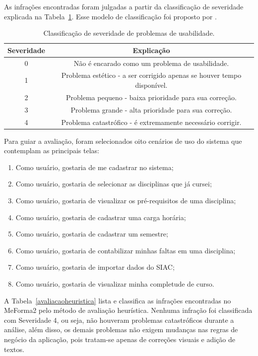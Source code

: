 As infrações encontradas foram julgadas a partir da classificação de severidade explicada na Tabela~\ref{severidade}. Esse modelo de classificação foi proposto por \cite{nielsen}.

\begin{table}[H]
\caption{Classificação de severidade de problemas de usabilidade.}
\label{severidade}
\begin{tabular}{ |c|c| } 
 \hline
 Severidade & Explicação \\
 \hline
 0 & Não é encarado como um problema de usabilidade. \\
 \hline
 1 & Problema estético - a ser corrigido apenas se houver tempo disponível. \\
 \hline
 2 &  Problema pequeno - baixa prioridade para sua correção. \\
 \hline
 3 & Problema grande - alta prioridade para sua correção. \\
 \hline
 4 &  Problema catastrófico - é extremamente necessário corrigir. \\
 \hline
\end{tabular}
\end{table}

Para guiar a avaliação, foram selecionados oito cenários de uso do sistema que contemplam as principais telas:

\begin{enumerate}
    \item Como usuário, gostaria de me cadastrar no sistema;
    \item Como usuário, gostaria de selecionar as disciplinas que já cursei;
    \item Como usuário, gostaria de visualizar os pré-requisitos de uma disciplina;
    \item Como usuário, gostaria de cadastrar uma carga horária;
    \item Como usuário, gostaria de cadastrar um semestre;
    \item Como usuário, gostaria de contabilizar minhas faltas em uma disciplina;
    \item Como usuário, gostaria de importar dados do SIAC;
    \item Como usuário, gostaria de visualizar minha completude de curso.
\end{enumerate}

A Tabela~\ref{avaliacaoheuristica} lista e classifica as infrações encontradas no MeForma2 pelo método de avaliação heurística. Nenhuma infração foi classificada com Severidade 4, ou seja, não houveram problemas catastróficos durante a análise, além disso, os demais problemas não exigem mudanças nas regras de negócio da aplicação, pois tratam-se apenas de correções visuais e adição de textos. 

